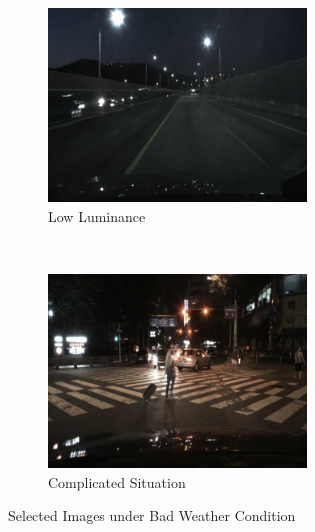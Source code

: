 \begin{spacing}{1.5}
\begin{figure}[!ht]
    ~
    \begin{subfigure}[b]{0.49\textwidth}
        \centering
        \includegraphics[width=2.7in, fbox]{Chapter5/scene_4-20160518_2015_42-000031.png}
        \caption{Low Luminance}
        \label{lowluminance}
    \end{subfigure}
    \\
    \begin{subfigure}[b]{0.98\textwidth}
        \centering
        \includegraphics[width=2.7in, fbox]{Chapter5/scene_4-20160805_2122_57-000241.png}
        \caption{Complicated Situation}
        \label{fig:complicated}
    \end{subfigure}%
    \caption{Selected Images under Bad Weather Condition}
    \label{fig:rainyimg}
\end{figure}


\end{spacing}
